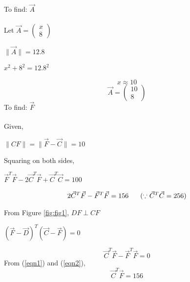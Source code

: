 \documentclass[letterpaper,12pt]{article}
\begin{document}
To find: $\Vec{A}$ \\ \\
Let $\Vec{A} = \begin{pmatrix} x \\ 8 \end{pmatrix}$

\begin{center}
    $\|\Vec{A}\| = 12.8$
\end{center}
\begin{center}
    $x^2 + 8^2 = 12.8^2$
\end{center}
\begin{equation}
    x \approx 10
\end{equation}
\begin{equation}
    \Vec{A} = \begin{pmatrix} 10 \\ 8 \end{pmatrix}
\end{equation}
To find: $\Vec{F}$ \\ \\
Given,
\begin{center}
    $\|CF\| = \|\Vec{F} - \Vec{C}\| = 10$
\end{center}
Squaring on both sides,
\begin{center}
    $\Vec{F}^T\Vec{F} - 2\Vec{C}^T\Vec{F} + \Vec{C}^T\Vec{C} = 100$
\end{center}
\begin{equation}
    2\Vec{C}^T\Vec{F} - \Vec{F}^T\Vec{F} = 156 \hspace{0.6cm} (\because \Vec{C}^T\Vec{C} = 256)
\label{eqn1}
\end{equation}

From Figure \ref{fig:fig1}, $DF \perp CF$
\begin{center}
    $(\Vec{F}-\Vec{D})^T(\Vec{C}-\Vec{F}) = 0$
\end{center}
\begin{equation}
    \Vec{C}^T\Vec{F} - \Vec{F}^T\Vec{F} = 0
\label{eqn2}
\end{equation}
From (\ref*{eqn1}) and (\ref*{eqn2}),
\begin{equation}
    \Vec{C}^T\Vec{F} = 156
\label{eqn3}
\end{equation}

\clearpage
\end{document}
